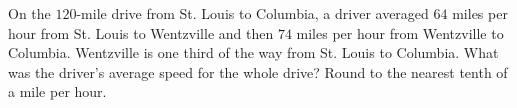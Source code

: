 On the $120$-mile drive from St. Louis to Columbia, a driver averaged $64$ miles per hour from St. Louis to Wentzville and then $74$ miles per hour from Wentzville to Columbia. Wentzville is one third of the way from St. Louis to Columbia. What was the driver's average speed for the whole drive? Round to the nearest tenth of a mile per hour.
